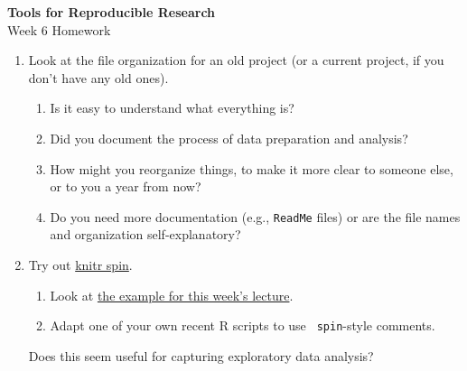\documentclass[12pt]{article}
\newcommand{\ttsm}{\tt \small}
\begin{document}
\thispagestyle{empty}

\textbf{Tools for Reproducible Research} \\
Week 6 Homework

\bigskip

\begin{enumerate}

\item Look at the file organization for an old project (or a current
  project, if you don't have any old ones).

  \begin{enumerate}
  \item Is it easy to understand what everything is?
  \item Did you document the process of data preparation and
    analysis?
  \item How might you reorganize things, to make it more clear to
    someone else, or to you a year from now?
  \item Do you need more documentation (e.g., {\ttsm ReadMe} files) or
    are the file names and organization self-explanatory?
  \end{enumerate}

\item Try out \href{http://yihui.name/knitr/demo/stitch/}{knitr spin}.

  \begin{enumerate}
    \item Look at
      \href{https://github.com/kbroman/Tools4RR/tree/master/06_Organization_EDA/Examples}{the
        example for this week's lecture}.
    \item Adapt one of your own recent R scripts to use {\ttsm
      spin}-style comments.
  \end{enumerate}

  Does this seem useful for capturing exploratory data analysis?
\end{enumerate}
\end{document}
